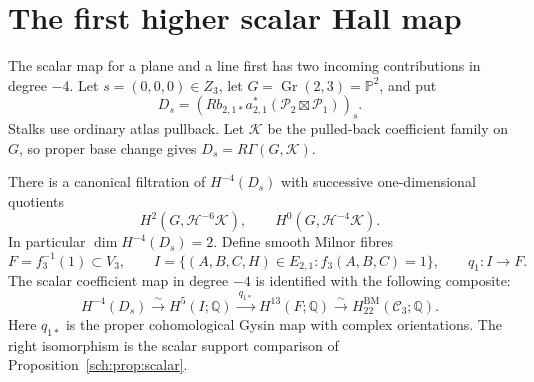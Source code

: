 \section{The first higher scalar Hall map}
\label{sch:sec:degree-four}

The scalar map for a plane and a line first has two incoming
contributions in degree $-4$. Let $s=(0,0,0)\in Z_3$, let
$G=\operatorname{Gr}(2,3)=\mathbb P^2$, and put
\[
 D_s=\left(Rb_{2,1*}a_{2,1}^*
                (\mathcal P_2\boxtimes\mathcal P_1)\right)_s.
\]
Stalks use ordinary atlas pullback. Let $\mathcal K$ be the pulled-back
coefficient family on $G$, so proper base change gives
$D_s=R\Gamma(G,\mathcal K)$.

\begin{proposition}
\label{sch:prop:degree-four}
There is a canonical filtration of $H^{-4}(D_s)$ with successive
one-dimensional quotients
\[
 H^2(G,\mathcal H^{-6}\mathcal K),\qquad
 H^0(G,\mathcal H^{-4}\mathcal K).
\]
In particular $\dim H^{-4}(D_s)=2$.
Define smooth Milnor fibres
\[
 F=f_3^{-1}(1)\subset V_3,\qquad
 I=\{(A,B,C,H)\in E_{2,1}:f_3(A,B,C)=1\},
 \qquad q_1:I\longrightarrow F.
\]
The scalar coefficient map in degree $-4$ is identified with the
following composite:
\begin{equation}
 H^{-4}(D_s)\xrightarrow{\sim}H^5(I;\mathbb Q)
 \xrightarrow{\ q_{1*}\ }H^{13}(F;\mathbb Q)
 \xrightarrow{\sim}H^{\mathrm{BM}}_{22}(\mathcal C_3;\mathbb Q).
 \label{sch:eq:degree-four-gysin}
\end{equation}
Here $q_{1*}$ is the proper cohomological Gysin map with complex
orientations. The right isomorphism is the scalar support comparison
of Proposition~\ref{sch:prop:scalar}.
\end{proposition}

